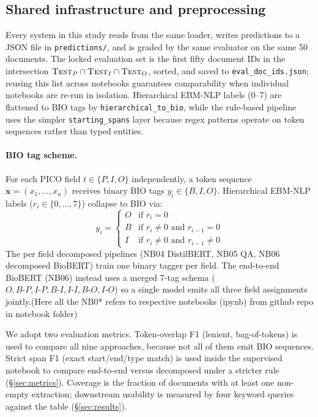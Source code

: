 \documentclass[11pt]{article}
\begin{document}
\subsection{Shared infrastructure and preprocessing}

Every system in this study reads from the same loader, writes predictions
to a JSON file in \texttt{predictions/}, and is graded by the same
evaluator on the same 50 documents. The locked evaluation set is the first
fifty document IDs in the intersection
$\textsc{Test}_P \cap \textsc{Test}_I \cap \textsc{Test}_O$, sorted, and
saved to \texttt{eval\_doc\_ids.json}; reusing this list across notebooks
guarantees comparability when individual notebooks are re-run in
isolation. Hierarchical EBM-NLP labels (0--7) are flattened to BIO tags by
\texttt{hierarchical\_to\_bio}, while the rule-based pipeline uses the
simpler \texttt{starting\_spans} layer because regex patterns operate on
token sequences rather than typed entities.
\paragraph{BIO tag scheme.} For each PICO field $t \in \{P, I, O\}$
independently, a token sequence $\mathbf{x} = (x_1, \dots, x_n)$ receives
binary BIO tags $y_i \in \{B, I, O\}$. Hierarchical EBM-NLP labels
($r_i \in \{0, \dots, 7\}$) collapse to BIO via:
\begin{equation}
y_i = \begin{cases}
O & \text{if } r_i = 0 \\
B & \text{if } r_i \neq 0 \text{ and } r_{i-1} = 0 \\
I & \text{if } r_i \neq 0 \text{ and } r_{i-1} \neq 0
\end{cases}
\label{eq:bio}
\end{equation}
The per field decomposed pipelines (NB04 DistilBERT, NB05 QA, NB06
decomposed BioBERT) train one binary tagger per field. The end-to-end
BioBERT (NB06) instead uses a merged 7-tag schema
($O, B\text{-}P, I\text{-}P, B\text{-}I, I\text{-}I, B\text{-}O, I\text{-}O$)
so a single model emits all three field assignments jointly.(Here all the NB0* refers to respective notebooks (ipynb) from github repo in notebook folder)

We adopt two evaluation metrics. Token-overlap F1 (lenient,
bag-of-tokens) is used to compare all nine approaches, because not all of
them emit BIO sequences. Strict span F1 (exact start/end/type match) is
used inside the supervised notebook to compare end-to-end versus
decomposed under a stricter rule (\S\ref{sec:metrics}). Coverage is the
fraction of documents with at least one non-empty extraction; downstream
usability is measured by four keyword queries against the table
(\S\ref{sec:results}).
\end{document}
